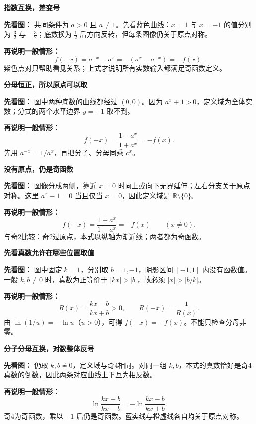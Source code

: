 \clearpage
\begin{explanationbox}
\textbf{\textcolor{CExplanation}{指数互换，差变号}}

\textbf{先看图：} 共同条件为 $a>0$ 且 $a\ne1$。先看蓝色曲线：$x=1$ 与 $x=-1$ 的值分别为 $\frac32$ 与 $-\frac32$；底数换为 $\frac12$ 后方向反转，但每条图像仍关于原点对称。

\textbf{再说明一般情形：}
\[
f(-x)=a^{-x}-a^x=-(a^x-a^{-x})=-f(x).
\]
紫色点对只帮助看见关系；上式才说明所有实数输入都满足奇函数定义。
\end{explanationbox}
\clearpage
\begin{explanationbox}
\textbf{\textcolor{CExplanation}{分母恒正，所以原点可以取}}

\textbf{先看图：} 图中两种底数的曲线都经过 $(0,0)$。因为 $a^x+1>0$，定义域为全体实数；分式的两个水平边界 $y=\pm1$ 取不到。

\textbf{再说明一般情形：}
\[
f(-x)=\frac{1-a^x}{1+a^x}=-f(x).
\]
先用 $a^{-x}=1/a^x$，再把分子、分母同乘 $a^x$。
\end{explanationbox}
\clearpage
\begin{explanationbox}
\textbf{\textcolor{CExplanation}{没有原点，仍是奇函数}}

\textbf{先看图：} 图像分成两侧，靠近 $x=0$ 时向上或向下无界延伸；左右分支关于原点对称。这里 $a^x-1=0$ 当且仅当 $x=0$，因此定义域是 $\mathbb R\setminus\{0\}$。

\textbf{再说明一般情形：}
\[
f(-x)=\frac{1+a^x}{1-a^x}=-f(x)\qquad(x\ne0).
\]
与奇2比较：奇2过原点，本式以纵轴为渐近线；两者都为奇函数。
\end{explanationbox}
\clearpage
\begin{explanationbox}
\textbf{\textcolor{CExplanation}{先看真数允许在哪些位置取值}}

\textbf{先看图：} 图中固定 $k=1$，分别取 $b=1,-1$，阴影区间 $[-1,1]$ 内没有函数值。一般 $k,b\ne0$ 时，真数为正等价于 $|kx|>|b|$，故必须 $|x|>|b/k|$。

\textbf{再说明一般情形：}
\[
R(x)=\frac{kx-b}{kx+b}>0,\qquad R(-x)=\frac1{R(x)}.
\]
由 $\ln(1/u)=-\ln u$（$u>0$），可得 $f(-x)=-f(x)$。不能只检查分母非零。
\end{explanationbox}
\clearpage
\begin{explanationbox}
\textbf{\textcolor{CExplanation}{分子分母互换，对数整体反号}}

\textbf{先看图：} 仍取 $k,b\ne0$，定义域与奇4相同。对同一组 $k,b$，本式的真数恰好是奇4真数的倒数，因此两条对应曲线上下互为相反数。

\textbf{再说明一般情形：}
\[
\ln\frac{kx+b}{kx-b}=-\ln\frac{kx-b}{kx+b}.
\]
奇4为奇函数，乘以 $-1$ 后仍是奇函数。蓝实线与橙虚线各自均关于原点对称。
\end{explanationbox}
